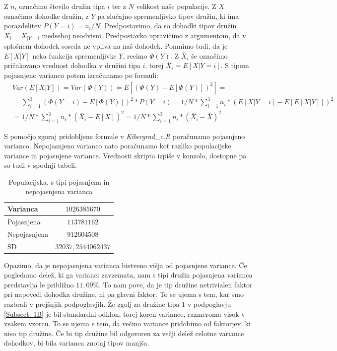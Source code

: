 \documentclass[a4paper, 10pt]{article}
\begin{document}
	Z $n_i$ označimo število družin tipa $i$ ter z $N$ velikost naše populacije. Z $X$ označimo dohodke družin, z $Y$ pa  slučajno spremenljivko tipov družin, ki ima porazdelitev $P(Y = i) = n_i / N$. Predpostavimo, da so dohodki tipov družin $X_i = X_{|Y=i}$ medseboj neodvisni. Predpostavko upravičimo z argumentom, da v splošnem dohodek soseda ne vpliva na naš dohodek. Pomnimo tudi, da je $E\left[X|Y\right]$ neka funkcija spremenljivke $Y$, recimo $\Phi(Y)$.
	Z $\bar{X}_i$ še označimo pričakovano vrednost dohodka v družini tipa $i$, torej $\bar{X}_i = E\left[X|Y = i\right]$. S tipom pojasnjeno varianco potem izračunamo po formuli: 
	\begin{align*} \label{eq: explvarC}
		& Var(E\left[X|Y\right]) = Var(\Phi(Y)) = E\left[(\Phi(Y)- E\left[\Phi(Y)\right])^2\right] =\\ 
		&= \sum_{i = 1}^{3} (\Phi(Y = i)- E\left[\Phi(Y)\right])^2 * P(Y = i) = 1/N * \sum_{i = 1}^{3} n_i * (E\left[X|Y = i\right] - E\left[E\left[X|Y\right]\right])^2 \\ &= 1/N * \sum_{i = 1}^{3} n_i * (\bar{X}_i - E\left[X\right])^2 = 1/N * \sum_{i = 1}^{3} n_i * (\bar{X}_i - \bar{X})^2
	\end{align*}

	S pomočjo zgoraj pridobljene formule v \textit{Kibergrad\_c.R} poračunamo pojasnjeno varianco. Nepojasnjeno varianco nato poračunamo kot razliko populacijske variance in pojasnjene variance. Vrednosti skripta izpiše v konzolo, dostopne pa so tudi v spodnji tabeli.
	
	\begin{table}[h!]
		\label{tab: varC}
		\centering
		\begin{tabular}{|l|c|}
			\hline
			Varianca & $1026385670$ \\ \hline
			Pojasnjena & $113781162$ \\ \hline
			Nepojasnjena & $912604508$ \\ \hline
			SD & $32037{,}2544062437$ \\ \hline
		\end{tabular}
		\caption{Populacijska, s tipi pojasnjena in nepojasnjena varianca}
	\end{table}
	
	Opazimo, da je nepojasnjena varianca bistveno višja od pojasnjene variance. Če pogledamo delež, ki ga varianci zavzemata, nam s tipi družin pojasnjena varianca predstavlja le približno $11{,}09\%$. To nam pove, da je tip družine netrivialen faktor pri napovedi dohodka družine, ni pa glavni faktor. To se ujema s tem, kar smo razbrali v prejšnjih podpoglavjih. Že zgolj za družine tipa $1$ v podpoglavju \ref{Subsect: 1B} je bil standardni odklon, torej koren variance, razmeroma visok v vsakem vzorcu. To se ujema s tem, da večino variance pridobimo od faktorjev, ki niso tip družine. Če bi tip družine bil odgovoren za večji delež celotne variance dohodkov, bi bila varianca znotaj tipov manjša.
	
\end{document}
